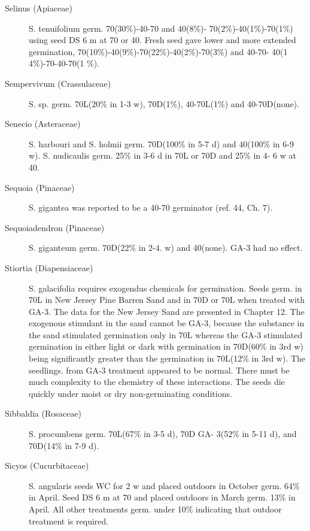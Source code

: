 \begin{description}
\item[Selinus (Apiaceae)] S. tenuifolium germ. 70(30\%)-40-70 and 40(8\%)-
70(2\%)-40(1\%)-70(1\%) using seed DS 6 m at 70 or 40. Fresh seed gave lower and
more extended germination, 70(10\%)-40(9\%)-70(22\%)-40(2\%)-70(3\%) and 40-70-
40(1 4\%)-70-40-70(1 \%).
\item[Sempervivum (Crassulaceae)] S. sp. germ. 70L(20\% in 1-3 w), 70D(1\%),
40-70L(1\%) and 40-70D(none).
\item[Senecio (Asteraceae)] S. harbouri and S. holmii germ. 70D(100\% in 5-7 d)
and 40(100\% in 6-9 w). S. nudicaulis germ. 25\% in 3-6 d in 70L or 70D and 25\% in 4-
6 w at 40.
\item[Sequoia (Pinaceae)] S. gigantea was reported to be a 40-70 germinator
(ref. 44, Ch. 7).
\item[Sequoiadendron (Pinaceae)] S. giganteum germ. 70D(22\% in 2-4. w) and
40(none). GA-3 had no effect.

\item[Stiortia (Diapensiaceae)] S. galacifolia requires exogendus chemicals for
germination. Seeds germ. in 70L in New Jersey Pine Barren Sand and in 70D or 70L
when treated with GA-3. The data for the New Jersey Sand are presented in Chapter
12. The exogenous stimulant in the sand cannot be GA-3, because the substance in
the sand stimulated germination only in 70L whereas the GA-3 stimulated germination
in either light or dark with germination in 70D(60\% in 3rd w) being significantly greater
than the germination in 70L(12\% in 3rd w). The seedlings. from GA-3 treatment
appeared to be normal. There must be much complexity to the chemistry of these
interactions. The seeds die quickly under moist or dry non-germinating conditions.
\item[Sibbaldia (Rosaceae)] S. procumbens germ. 70L(67\% in 3-5 d), 70D GA-
3(52\% in 5-11 d), and 70D(14\% in 7-9 d).
\item[Sicyos (Cucurbitaceae)] S. angularis seeds WC for 2 w and placed
outdoors in October germ. 64\% in April. Seed DS 6 m at 70 and placed outdoors in
March germ. 13\% in April. All other treatments germ. under 10\% indicating that
outdoor treatment is required.


\end{description}
